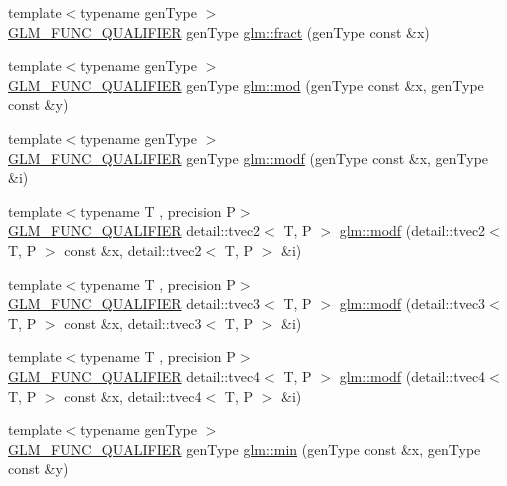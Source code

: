 \begin{DoxyCompactItemize}
\item 
{\footnotesize template$<$typename gen\+Type $>$ }\\\hyperlink{setup_8hpp_a33fdea6f91c5f834105f7415e2a64407}{G\+L\+M\+\_\+\+F\+U\+N\+C\+\_\+\+Q\+U\+A\+L\+I\+F\+I\+ER} gen\+Type \hyperlink{group__core__func__common_gad04ac2908d032d5518d5f6c8403dbc8b}{glm\+::fract} (gen\+Type const \&x)
\item 
{\footnotesize template$<$typename gen\+Type $>$ }\\\hyperlink{setup_8hpp_a33fdea6f91c5f834105f7415e2a64407}{G\+L\+M\+\_\+\+F\+U\+N\+C\+\_\+\+Q\+U\+A\+L\+I\+F\+I\+ER} gen\+Type \hyperlink{group__core__func__common_ga8cc8a75b05125fe1c30de43102ef42e1}{glm\+::mod} (gen\+Type const \&x, gen\+Type const \&y)
\item 
{\footnotesize template$<$typename gen\+Type $>$ }\\\hyperlink{setup_8hpp_a33fdea6f91c5f834105f7415e2a64407}{G\+L\+M\+\_\+\+F\+U\+N\+C\+\_\+\+Q\+U\+A\+L\+I\+F\+I\+ER} gen\+Type \hyperlink{group__core__func__common_gae47da02eb07d660201c09a0df7298a05}{glm\+::modf} (gen\+Type const \&x, gen\+Type \&i)
\item 
{\footnotesize template$<$typename T , precision P$>$ }\\\hyperlink{setup_8hpp_a33fdea6f91c5f834105f7415e2a64407}{G\+L\+M\+\_\+\+F\+U\+N\+C\+\_\+\+Q\+U\+A\+L\+I\+F\+I\+ER} detail\+::tvec2$<$ T, P $>$ \hyperlink{namespaceglm_a853da29134180c976324f3db6ae57efd}{glm\+::modf} (detail\+::tvec2$<$ T, P $>$ const \&x, detail\+::tvec2$<$ T, P $>$ \&i)
\item 
{\footnotesize template$<$typename T , precision P$>$ }\\\hyperlink{setup_8hpp_a33fdea6f91c5f834105f7415e2a64407}{G\+L\+M\+\_\+\+F\+U\+N\+C\+\_\+\+Q\+U\+A\+L\+I\+F\+I\+ER} detail\+::tvec3$<$ T, P $>$ \hyperlink{namespaceglm_a9ffab41035ab5fc8709bb582a3d8fae5}{glm\+::modf} (detail\+::tvec3$<$ T, P $>$ const \&x, detail\+::tvec3$<$ T, P $>$ \&i)
\item 
{\footnotesize template$<$typename T , precision P$>$ }\\\hyperlink{setup_8hpp_a33fdea6f91c5f834105f7415e2a64407}{G\+L\+M\+\_\+\+F\+U\+N\+C\+\_\+\+Q\+U\+A\+L\+I\+F\+I\+ER} detail\+::tvec4$<$ T, P $>$ \hyperlink{namespaceglm_aeeecd3b255dc5fc394738bd25e0cea49}{glm\+::modf} (detail\+::tvec4$<$ T, P $>$ const \&x, detail\+::tvec4$<$ T, P $>$ \&i)
\item 
{\footnotesize template$<$typename gen\+Type $>$ }\\\hyperlink{setup_8hpp_a33fdea6f91c5f834105f7415e2a64407}{G\+L\+M\+\_\+\+F\+U\+N\+C\+\_\+\+Q\+U\+A\+L\+I\+F\+I\+ER} gen\+Type \hyperlink{group__core__func__common_ga3dc90dbd66c9ca1dd5625c93d9c50f02}{glm\+::min} (gen\+Type const \&x, gen\+Type const \&y)

\end{DoxyCompactItemize}
